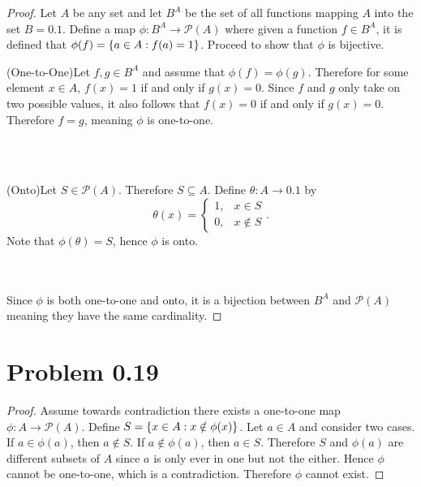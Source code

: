 \documentclass[12pt]{extarticle}
\newcommand{\powerset}[1]{\mathcal{P}(#1)}
\begin{document}
\begin{proof}
	Let $A$ be any set and let $B^A$ be the set of all functions mapping $A$ into the set $B = \qty{0,1}$. Define a map $\phi: B^A \to \powerset{A}$ where given a function $f \in B^A$, it is defined that $\phi(f) = \qty{a \in A : f(a) = 1}$. Proceed to show that $\phi$ is bijective. \\

	\qquad \begin{minipage}{\dimexpr\textwidth - 3cm}
		(One-to-One)\quad Let $f,g \in B^A$ and assume that $\phi(f) = \phi(g)$. Therefore for some element $x \in A$, $f(x) = 1$ if and only if $g(x) = 0$. Since $f$ and $g$ only take on two possible values, it also follows that $f(x) = 0$ if and only if $g(x) = 0$. Therefore $f = g$, meaning $\phi$ is one-to-one.
	\end{minipage} \\
	\\

	\qquad \begin{minipage}{\dimexpr\textwidth - 3cm}
		(Onto)\quad Let $S \in \powerset{A}$. Therefore $S \subseteq A$. Define $\theta : A \rightarrow \qty{0,1}$ by 
		\[
			\theta(x) = \begin{cases}
				1, &x \in S \\ 
				0, &x \notin S
			\end{cases}
		.\]
		Note that $\phi(\theta) = S$, hence $\phi$ is onto.
	\end{minipage} \\
	\\

	Since $\phi$ is both one-to-one and onto, it is a bijection between $B^A$ and $\powerset{A}$ meaning they have the same cardinality.
\end{proof}

\section*{Problem 0.19}

\begin{proof}
	Assume towards contradiction there exists a one-to-one map $\phi : A \rightarrow \powerset{A}$. Define $S = \qty{x \in A : x \notin \phi(x)}$. Let $a \in A$ and consider two cases. If $a \in \phi(a)$, then $a \notin S$. If $a \notin \phi(a)$, then $a \in S$. Therefore $S$ and $\phi(a)$ are different subsets of $A$ since $a$ is only ever in one but not the either. Hence $\phi$ cannot be one-to-one, which is a contradiction. Therefore $\phi$ cannot exist.
\end{proof}
\end{document}
